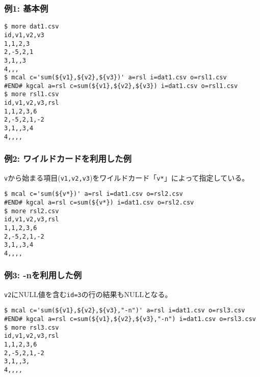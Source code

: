 \subsubsection*{例1: 基本例}



\begin{Verbatim}[baselinestretch=0.7,frame=single]
$ more dat1.csv
id,v1,v2,v3
1,1,2,3
2,-5,2,1
3,1,,3
4,,,
$ mcal c='sum(${v1},${v2},${v3})' a=rsl i=dat1.csv o=rsl1.csv
#END# kgcal a=rsl c=sum(${v1},${v2},${v3}) i=dat1.csv o=rsl1.csv
$ more rsl1.csv
id,v1,v2,v3,rsl
1,1,2,3,6
2,-5,2,1,-2
3,1,,3,4
4,,,,
\end{Verbatim}
\subsubsection*{例2: ワイルドカードを利用した例}

\verb|v|から始まる項目(\verb|v1,v2,v3|)をワイルドカード「\verb|v*|」によって指定している。


\begin{Verbatim}[baselinestretch=0.7,frame=single]
$ mcal c='sum(${v*})' a=rsl i=dat1.csv o=rsl2.csv
#END# kgcal a=rsl c=sum(${v*}) i=dat1.csv o=rsl2.csv
$ more rsl2.csv
id,v1,v2,v3,rsl
1,1,2,3,6
2,-5,2,1,-2
3,1,,3,4
4,,,,
\end{Verbatim}
\subsubsection*{例3: -nを利用した例}

\verb|v2|にNULL値を含む\verb|id=3|の行の結果もNULLとなる。


\begin{Verbatim}[baselinestretch=0.7,frame=single]
$ mcal c='sum(${v1},${v2},${v3},"-n")' a=rsl i=dat1.csv o=rsl3.csv
#END# kgcal a=rsl c=sum(${v1},${v2},${v3},"-n") i=dat1.csv o=rsl3.csv
$ more rsl3.csv
id,v1,v2,v3,rsl
1,1,2,3,6
2,-5,2,1,-2
3,1,,3,
4,,,,
\end{Verbatim}
